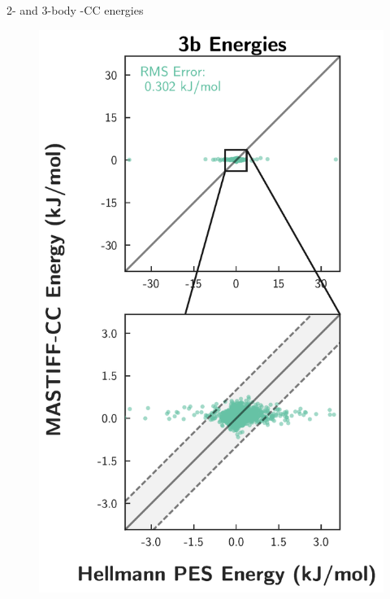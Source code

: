 \begin{section}{2- and 3-body \mastiff-CC \texorpdfstring{\co} {} energies}
\begin{figure}
\begin{minipage}[b]{0.4\textwidth}
      \end{minipage}
      \hfill
      \begin{minipage}[b]{0.4\textwidth}
      \includegraphics[height=2\textwidth]{anisotropic/si/co2_snapshots/trimers_snapshot/co2_trimer_comparison.pdf}

\end{minipage}
\end{figure}
\end{section}
